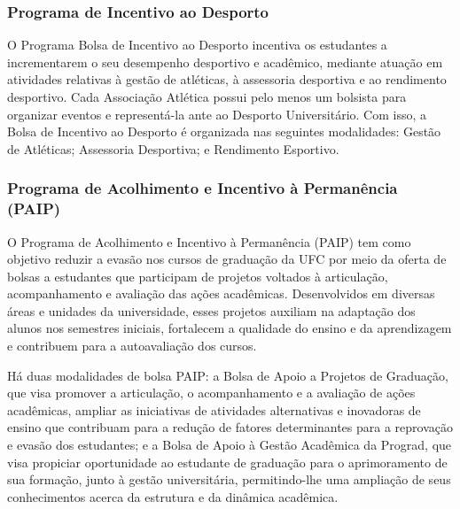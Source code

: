 


\subsubsection{Programa de Incentivo ao Desporto}

O Programa Bolsa de Incentivo ao Desporto incentiva os estudantes a incrementarem o seu desempenho desportivo e acadêmico, mediante atuação em atividades relativas à gestão de atléticas, à assessoria desportiva e ao rendimento desportivo. Cada Associação Atlética possui pelo menos um bolsista para organizar eventos e representá-la ante ao Desporto Universitário. Com isso, a Bolsa de Incentivo ao Desporto é organizada nas seguintes modalidades: Gestão de Atléticas; Assessoria Desportiva; e Rendimento Esportivo.

\subsubsection{Programa de Acolhimento e Incentivo à Permanência (PAIP)}

O Programa de Acolhimento e Incentivo à Permanência (PAIP) tem como objetivo reduzir a evasão nos cursos de graduação da UFC por meio da oferta de bolsas a estudantes que participam de projetos voltados à articulação, acompanhamento e avaliação das ações acadêmicas. Desenvolvidos em diversas áreas e unidades da universidade, esses projetos auxiliam na adaptação dos alunos nos semestres iniciais, fortalecem a qualidade do ensino e da aprendizagem e contribuem para a autoavaliação dos cursos.

Há duas modalidades de bolsa PAIP: a Bolsa de Apoio a Projetos de Graduação, que visa promover a articulação, o acompanhamento e a avaliação de ações acadêmicas,  ampliar as iniciativas de atividades alternativas e inovadoras de ensino que contribuam para a redução de fatores determinantes para a reprovação e evasão dos estudantes; e a Bolsa de Apoio à Gestão Acadêmica da Prograd, que visa propiciar oportunidade ao estudante de graduação para o aprimoramento de sua formação, junto à gestão universitária, permitindo-lhe uma ampliação de seus conhecimentos acerca da estrutura e da dinâmica acadêmica. 

